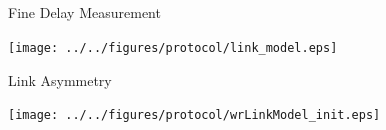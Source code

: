 \documentclass[compress,red]{beamer}
\begin{document}
\subsection{}
\begin{frame}{Fine Delay Measurement}

  \begin{center}
  \texttt{[image: ../../figures/protocol/link\_model.eps]}
  \end{center}

\end{frame}
\begin{frame}{Link Asymmetry}

  \begin{center}
  \texttt{[image: ../../figures/protocol/wrLinkModel\_init.eps]}
  \end{center}

\end{frame}
\end{document}

